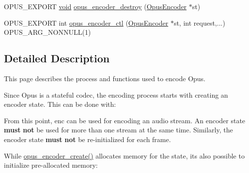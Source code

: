 \begin{DoxyCompactItemize}
\item 
O\+P\+U\+S\+\_\+\+E\+X\+P\+O\+RT \mbox{\hyperlink{_s_d_l__opengles2__gl2ext_8h_ae5d8fa23ad07c48bb609509eae494c95}{void}} \mbox{\hyperlink{group__opus__encoder_ga899c69582a1cad2a168aedc99cab7be0}{opus\+\_\+encoder\+\_\+destroy}} (\mbox{\hyperlink{group__opus__encoder_gaf461a3ef2f10c2fe8b994a176f06c9bd}{Opus\+Encoder}} $\ast$st)
\item 
O\+P\+U\+S\+\_\+\+E\+X\+P\+O\+RT int \mbox{\hyperlink{group__opus__encoder_ga88cb327d8f7d6a96c7d2d0b8461512e6}{opus\+\_\+encoder\+\_\+ctl}} (\mbox{\hyperlink{group__opus__encoder_gaf461a3ef2f10c2fe8b994a176f06c9bd}{Opus\+Encoder}} $\ast$st, int request,...) O\+P\+U\+S\+\_\+\+A\+R\+G\+\_\+\+N\+O\+N\+N\+U\+LL(1)
\end{DoxyCompactItemize}


\subsection{Detailed Description}
This page describes the process and functions used to encode Opus. 

Since Opus is a stateful codec, the encoding process starts with creating an encoder state. This can be done with\+:


\begin{DoxyCode}{0}
\end{DoxyCode}


From this point, {\ttfamily enc} can be used for encoding an audio stream. An encoder state {\bfseries{must}} {\bfseries{not}} be used for more than one stream at the same time. Similarly, the encoder state {\bfseries{must}} {\bfseries{not}} be re-\/initialized for each frame.

While \mbox{\hyperlink{group__opus__encoder_ga8a145618886fed2d6fbc79a4071a939d}{opus\+\_\+encoder\+\_\+create()}} allocates memory for the state, it\textquotesingle{}s also possible to initialize pre-\/allocated memory\+:


\begin{DoxyCode}{0}
\end{DoxyCode}



